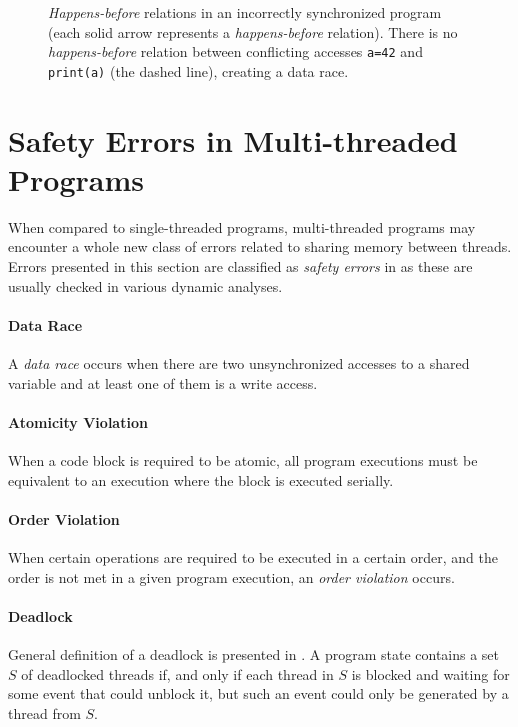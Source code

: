 \begin{figure}[hbt]
    \label{hb2}
    
    \caption{\emph{Happens-before} relations in an incorrectly synchronized
    program (each solid arrow represents a \emph{happens-before} relation).
    There is no \emph{happens-before} relation between conflicting accesses
    \texttt{a=42} and \texttt{print(a)} (the dashed line), creating a data race.}
\end{figure}


\section{Safety Errors in Multi-threaded Programs}

When compared to single-threaded programs, multi-threaded programs may encounter
a whole new class of errors related to sharing memory between threads. Errors
presented in this section are classified as \emph{safety errors} in \cite{letko}
as these are usually checked in various dynamic analyses.

\paragraph{Data Race}
A \emph{data race} occurs when there are two unsynchronized accesses to a shared
variable and at least one of them is a write access.

\paragraph{Atomicity Violation}
When a code block is required to be atomic, all
program executions must be equivalent to an execution where the block is
executed serially.

\paragraph{Order Violation}
When certain operations are required to be executed
in a certain order, and the order is not met in a given program execution, an
\emph{order violation} occurs.

\paragraph{Deadlock}
General definition of a deadlock is presented in
\cite{letko}. A program state contains a set $S$ of deadlocked threads if, and
only if each thread in $S$ is blocked and waiting for some event that could
unblock it, but such an event could only be generated by a thread from $S$.

